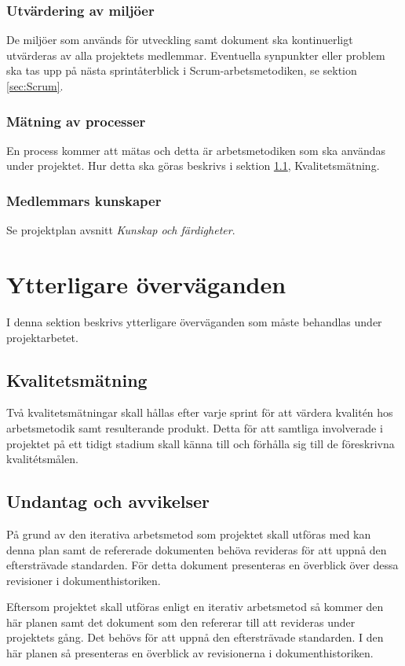 \documentclass[a4paper,10pt]{article}
\begin{document}
\subsubsection{Utvärdering av miljöer}
De miljöer som används för utveckling samt dokument ska kontinuerligt utvärderas av alla projektets medlemmar. Eventuella synpunkter eller problem ska tas upp på nästa sprintåterblick i Scrum-arbetsmetodiken, se sektion \ref{sec:Scrum}.

\subsubsection{Mätning av processer}
En process kommer att mätas och detta är arbetsmetodiken som ska användas under projektet. Hur detta ska göras beskrivs i sektion \ref{sec:Kvalitetsmatning}, Kvalitetsmätning.

\subsubsection{Medlemmars kunskaper}
Se projektplan avsnitt \emph{Kunskap och färdigheter}.

\section{Ytterligare överväganden}
I denna sektion beskrivs ytterligare överväganden som måste behandlas under projektarbetet.
\subsection{Kvalitetsmätning}
\label{sec:Kvalitetsmatning}
Två kvalitetsmätningar skall hållas efter varje sprint för att värdera kvalitén hos arbetsmetodik samt resulterande produkt.
Detta för att samtliga involverade i projektet på ett tidigt stadium skall känna till och förhålla sig till de föreskrivna kvalitétsmålen.

\subsection{Undantag och avvikelser}
På grund av den iterativa arbetsmetod som projektet skall utföras med kan  denna plan samt de refererade dokumenten behöva revideras för att uppnå den eftersträvade standarden. För detta dokument presenteras en överblick över dessa revisioner i dokumenthistoriken.

Eftersom projektet skall utföras enligt en iterativ arbetsmetod så kommer den här planen samt det dokument som den refererar till att revideras under projektets gång. Det behövs för att uppnå den eftersträvade standarden. I den här planen så presenteras en överblick av revisionerna i dokumenthistoriken.
\end{document}
